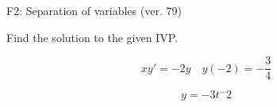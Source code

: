 \begin{exercise}
  \begin{exerciseTitle}F2: Separation of variables (ver. 79)\end{exerciseTitle}
  \begin{exerciseStatement}
    
Find the solution to the given IVP.

    
\[xy'= -2 y \hspace{1em} y( -2 ) = -\frac{3}{4}\]

  \end{exerciseStatement}
  \begin{exerciseAnswer}
    
\[y= -3 t^ -2\]

  \end{exerciseAnswer}
\end{exercise}